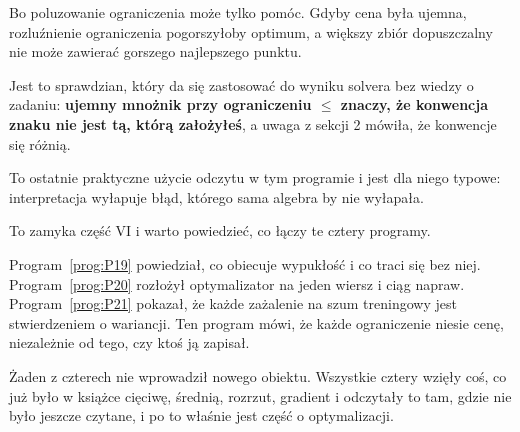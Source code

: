 \begin{fr}
\begin{ansblock}
Bo poluzowanie ograniczenia może tylko pomóc. Gdyby cena była ujemna,
rozluźnienie
ograniczenia pogorszyłoby optimum, a większy zbiór dopuszczalny nie może
zawierać gorszego najlepszego punktu.
\end{ansblock}

Jest to sprawdzian, który da się zastosować do wyniku solvera bez wiedzy o
zadaniu: \textbf{ujemny mnożnik przy ograniczeniu $\le$ znaczy, że konwencja
znaku nie jest tą, którą założyłeś}, a uwaga z sekcji 2 mówiła, że konwencje się
różnią.

To ostatnie praktyczne użycie odczytu w tym programie i jest dla niego typowe:
interpretacja wyłapuje błąd, którego sama algebra by nie wyłapała.
\end{fr}

\begin{fr}
To zamyka część VI i warto powiedzieć, co łączy te cztery programy.

Program~\ref{prog:P19} powiedział, co obiecuje wypukłość i co traci się bez
niej. Program~\ref{prog:P20} rozłożył optymalizator na jeden wiersz i ciąg
napraw. Program~\ref{prog:P21} pokazał, że każde zażalenie na szum treningowy
jest stwierdzeniem o wariancji. Ten program mówi, że każde ograniczenie niesie
cenę, niezależnie od tego, czy ktoś ją zapisał.

Żaden z czterech nie wprowadził nowego obiektu. Wszystkie cztery wzięły coś, co
już było w książce \dash{} cięciwę, średnią, rozrzut, gradient \dash{} i
odczytały to tam, gdzie nie było jeszcze czytane, i po to właśnie jest część o
optymalizacji.
\end{fr}

